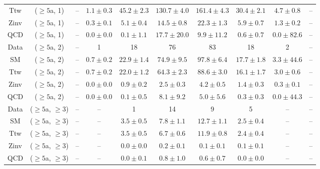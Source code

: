\begin{table}[h!]
{\begin{tabular}{cccccccccc}
	Ttw & ($\ge5$a, 1) & -- & $1.1\pm 0.3$ & $45.2\pm 2.3$ & $130.7\pm 4.0$ & $161.4\pm 4.3$ & $30.4\pm 2.1$ & $4.7\pm 0.8$ & -- \\[0.5ex] 
	Zinv & ($\ge5$a, 1) & -- & $0.3\pm 0.1$ & $5.1\pm 0.4$ & $14.5\pm 0.8$ & $22.3\pm 1.3$ & $5.9\pm 0.7$ & $1.3\pm 0.2$ & -- \\[0.5ex] 
	QCD & ($\ge5$a, 1) & -- & $0.0\pm 0.0$ & $0.1\pm 1.1$ & $17.7\pm 20.0$ & $9.9\pm 11.2$ & $0.6\pm 0.7$ & $0.0\pm 82.6$ & -- \\[0.5ex] 
	Data & ($\ge5$a, 2) & -- & 1 & 18 & 76 & 83 & 18 & 2 & -- \\[0.5ex] 
	SM & ($\ge5$a, 2) & -- & $0.7\pm 0.2$ & $22.9\pm 1.4$ & $74.9\pm 9.5$ & $97.8\pm 6.4$ & $17.7\pm 1.8$ & $3.3\pm 44.6$ & -- \\[0.5ex] 
	Ttw & ($\ge5$a, 2) & -- & $0.7\pm 0.2$ & $22.0\pm 1.2$ & $64.3\pm 2.3$ & $88.6\pm 3.0$ & $16.1\pm 1.7$ & $3.0\pm 0.6$ & -- \\[0.5ex] 
	Zinv & ($\ge5$a, 2) & -- & $0.0\pm 0.0$ & $0.9\pm 0.2$ & $2.5\pm 0.3$ & $4.2\pm 0.5$ & $1.4\pm 0.3$ & $0.3\pm 0.1$ & -- \\[0.5ex] 
	QCD & ($\ge5$a, 2) & -- & $0.0\pm 0.0$ & $0.1\pm 0.5$ & $8.1\pm 9.2$ & $5.0\pm 5.6$ & $0.3\pm 0.3$ & $0.0\pm 44.3$ & -- \\[0.5ex] 
	Data & ($\ge5$a, $\ge3$) & -- & -- & 1 & 14 & 9 & 5 & -- & -- \\[0.5ex] 
	SM & ($\ge5$a, $\ge3$) & -- & -- & $3.5\pm 0.5$ & $7.8\pm 1.1$ & $12.7\pm 1.1$ & $2.5\pm 0.4$ & -- & -- \\[0.5ex] 
	Ttw & ($\ge5$a, $\ge3$) & -- & -- & $3.5\pm 0.5$ & $6.7\pm 0.6$ & $11.9\pm 0.8$ & $2.4\pm 0.4$ & -- & -- \\[0.5ex] 
	Zinv & ($\ge5$a, $\ge3$) & -- & -- & $0.0\pm 0.0$ & $0.2\pm 0.1$ & $0.1\pm 0.1$ & $0.1\pm 0.1$ & -- & -- \\[0.5ex] 
	QCD & ($\ge5$a, $\ge3$) & -- & -- & $0.0\pm 0.1$ & $0.8\pm 1.0$ & $0.6\pm 0.7$ & $0.0\pm 0.0$ & -- & -- \\[0.5ex] 
	\hline
	\hline
\end{tabular}}
\end{table}
